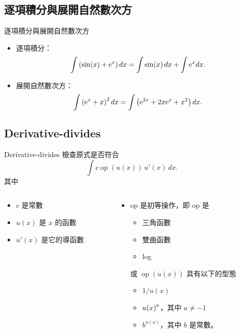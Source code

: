 \documentclass{beamer}
\newcommand{\Left} {\mathopen{}\mathclose\bgroup\left}
\newcommand{\Right}{\aftergroup\egroup\right}
\newcommand{\e}{\textup e}
\newcommand{\op}  {\operatorname{op}}
\theoremstyle{remark}
\begin{document}
\begin{CJK}{UTF8}{bsmi}
\subsection[逐項積分]{逐項積分與展開自然數次方}
\begin{frame}{逐項積分與展開自然數次方}
  \begin{itemize}
    \item 逐項積分：
      \[\int \left( \sin(x) + \e^x \right) dx = \int \sin(x)\,dx + \int \e^x dx.\]
    \item 展開自然數次方：
      \[\int \left( \e^x + x \right)^2 dx = \int \left( \e^{2x} + 2x\e^x + x^2 \right) dx.\]
  \end{itemize}
\end{frame}

\subsection[Deriv.\ divides]{Derivative-divides}
\begin{frame}{Derivative-divides}
  檢查原式是否符合
  \begin{equation}
    \int c \op(u(x))\,u'(x)\,dx. \label{eq:DerivativeDivides}
  \end{equation}
  其中
  \begin{columns}
    \begin{column}[t]{0.4\textwidth}
      \begin{itemize}
	\item $c$ 是常數
	\item $u(x)$ 是 $x$ 的函數
	\item $u'(x)$ 是它的導函數
      \end{itemize}
    \end{column}
    \begin{column}[t]{0.6\textwidth}
      \begin{itemize}
	\item op 是初等操作，即 op 是
	  \begin{itemize}
	    \item 三角函數
	    \item 雙曲函數
	    \item log
	  \end{itemize}
	  或 $\op(u(x))$ 具有以下的型態
	  \begin{itemize}
	    \item $1/u(x)$
	    \item $u \Left( x \Right)^a$，其中 $a \ne -1$
	    \item $b^{u(x)}$，其中 $b$ 是常數。
	  \end{itemize}
      \end{itemize}
    \end{column}
  \end{columns}
\end{frame}


\end{CJK}
\end{document}
